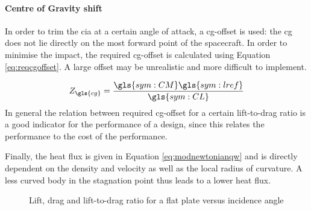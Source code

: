 \paragraph{Centre of Gravity shift}
In order to trim the \gls{cia} at a certain angle of attack, a \gls{cg}-offset is used: the \gls{cg} does not lie directly on the most forward point of the spacecraft. In order to minimise the impact, the required \gls{cg}-offset is calculated using Equation \ref{eq:reqcgoffset}. A large offset may be unrealistic and more difficult to implement.

\begin{equation} \label{eq:reqcgoffset}
Z_{\gls{cg}} = \frac{\gls{sym:CM}\gls{sym:lref}}{\gls{sym:CL}}
\end{equation}
In general the relation between required \gls{cg}-offset for a certain lift-to-drag ratio is a good indicator for the performance of a design, since this relates the performance to the cost of the performance.

Finally, the heat flux is given in Equation \ref{eq:modnewtonianqw} and is directly dependent on the density and velocity as well as the local radius of curvature. A less curved body in the stagnation point thus leads to a lower heat flux.

\begin{figure}[h]
	\centering
	\setlength{} 
	\setlength{}
	
	\caption{Lift, drag and lift-to-drag ratio for a flat plate versus incidence angle}
	\label{fig:CLCD-incidence}
\end{figure}

